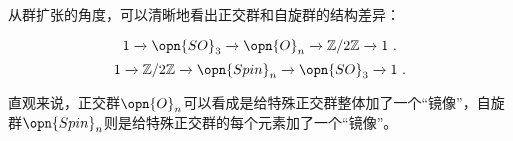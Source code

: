 \begin{example}{}
从群扩张的角度，可以清晰地看出正交群和自旋群的结构差异：

\begin{equation}
    1\xrightarrow{}\opn{SO}_3\xrightarrow{}\opn{O}_n\xrightarrow{}\mathbb{Z}/2\mathbb{Z}\xrightarrow{}1~. 
\end{equation}
\begin{equation}
    1\xrightarrow{}\mathbb{Z}/2\mathbb{Z}\xrightarrow{}\opn{Spin}_n\xrightarrow{}\opn{SO}_3\xrightarrow{}1~. 
\end{equation}

直观来说，正交群$\opn{O}_n$可以看成是给特殊正交群整体加了一个“镜像”，自旋群$\opn{Spin}_n$则是给特殊正交群的每个元素加了一个“镜像”。

\end{example}






























